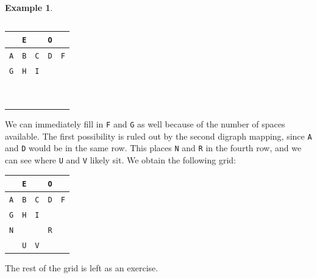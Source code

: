 \documentclass{book}
\theoremstyle{plain}
\theoremstyle{definition}
\newtheorem{example}[theorem]{Example}
\newcommand{\ciphertext}[1]{\texttt{#1}} %
\begin{document}
\begin{example}
\begin{center}
\begin{tabular}{|c|c|c|c|c|}
\hline
\end{tabular}
\begin{tabular}{|c|c|c|c|c|}
\hline
\ciphertext{ } & \ciphertext{E} & \ciphertext{ } & \ciphertext{O} & \ciphertext{ } \\
\hline
\ciphertext{A} & \ciphertext{B} & \ciphertext{C} & \ciphertext{D} & \ciphertext{F} \\
\hline
\ciphertext{G} & \ciphertext{H} & \ciphertext{I} & \ciphertext{ } & \ciphertext{ } \\
\hline
\ciphertext{ } & \ciphertext{ } & \ciphertext{ } & \ciphertext{ } & \ciphertext{ } \\
\hline
\ciphertext{ } & \ciphertext{ } & \ciphertext{ } & \ciphertext{ } & \ciphertext{ } \\
\hline
\end{tabular}
\end{center}
We can immediately fill in \ciphertext{F} and \ciphertext{G} as well because of the number of spaces available. The first possibility is ruled out by the second digraph mapping, since \ciphertext{A} and \ciphertext{D} would be in the same row. This places \ciphertext{N} and \ciphertext{R} in the fourth row, and we can see where \ciphertext{U} and \ciphertext{V} likely sit. We obtain the following grid:
\begin{center}
\begin{tabular}{|c|c|c|c|c|}
\hline
\ciphertext{ } & \ciphertext{E} & \ciphertext{ } & \ciphertext{O} & \ciphertext{ } \\
\hline
\ciphertext{A} & \ciphertext{B} & \ciphertext{C} & \ciphertext{D} & \ciphertext{F} \\
\hline
\ciphertext{G} & \ciphertext{H} & \ciphertext{I} & \ciphertext{ } & \ciphertext{ } \\
\hline
\ciphertext{N} & \ciphertext{ } & \ciphertext{ } & \ciphertext{R} & \ciphertext{ } \\
\hline
\ciphertext{ } & \ciphertext{U} & \ciphertext{V} & \ciphertext{ } & \ciphertext{ } \\
\hline
\end{tabular}
\end{center}
The rest of the grid is left as an exercise.
\end{example}
\end{document}
